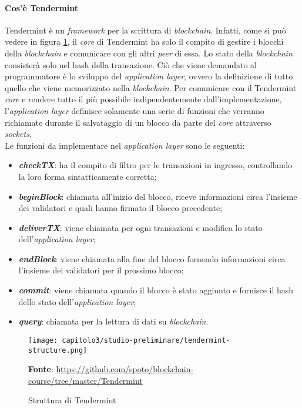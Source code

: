 \paragraph{Cos'è Tendermint}
Tendermint è un \textit{framework} per la scrittura di \textit{blockchain}. Infatti, come si può vedere in figura \ref{fig:tendermint-structure}, il \textit{core} di Tendermint ha solo il compito di gestire i blocchi della \textit{blockchain} e comunicare con gli altri \textit{peer} di essa. Lo stato della \textit{blockchain} consisterà solo nel hash della transazione. Ciò che viene demandato al programmatore è lo sviluppo del \textit{application layer}, ovvero la definizione di tutto quello che viene memorizzato nella \textit{blockchain}. Per comunicare con il Tendermint \textit{core} e rendere tutto il più possibile indipendentemente dall'implementazione, l'\textit{application layer} definisce solamente una serie di funzioni che verranno richiamate durante il salvataggio di un blocco da parte del \textit{core} attraverso \textit{sockets}. \\

\noindent Le funzioni da implementare nel \textit{application layer} sono le seguenti:
\begin{itemize}
  \item \textbf{\textit{checkTX}}: ha il compito di filtro per le transazioni in ingresso, controllando la loro forma sintatticamente corretta;
  \item \textbf{\textit{beginBlock}}: chiamata all'inizio del blocco, riceve informazioni circa l'insieme dei validatori e quali hanno firmato il blocco precedente;
  \item \textbf{\textit{deliverTX}}: viene chiamata per ogni transazioni e modifica lo stato dell'\textit{application layer};
  \item \textbf{\textit{endBlock}}: viene chiamata alla fine del blocco fornendo informazioni circa l'insieme dei validatori per il prossimo blocco;
  \item \textbf{\textit{commit}}: viene chiamata quando il blocco è stato aggiunto e fornisce il hash dello stato dell'\textit{application layer};
  \item \textbf{\textit{query}}: chiamata per la lettura di dati su \textit{blockchain}.
\end{itemize}

\begin{figure}[h!]
  \centering
  \texttt{[image: capitolo3/studio-preliminare/tendermint-structure.png]}
  \caption{Struttura di Tendermint}
  \textbf{Fonte}: \href{https://github.com/spoto/blockchain-course/tree/master/Tendermint}{https://github.com/spoto/blockchain-course/tree/master/Tendermint} 
  \label{fig:tendermint-structure}
\end{figure}

